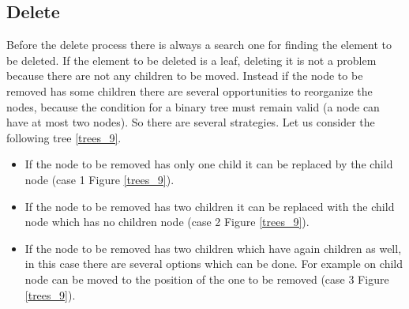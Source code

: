 \subsection{Delete}
Before the delete process there is always a search one for finding the element to be deleted. If the element to be deleted is a leaf, deleting it is not a problem because there are not any children to be moved. Instead if the node to be removed has some children there are several opportunities to reorganize the nodes, because the condition for a binary tree must remain valid (a node can have at most two nodes). So there are several strategies. Let us consider the following tree \ref{trees_9}. 
\begin{itemize}
\item If the node to be removed has only one child it can be replaced by the child node (case 1 Figure \ref{trees_9}).
\item If the node to be removed has two children it can be replaced with the child node which has no children node (case 2 Figure \ref{trees_9}).
\item If the node to be removed has two children which have again children as well, in this case there are several options which can be done. For example on child node can be moved to the position of the one to be removed (case 3 Figure \ref{trees_9}).
\end{itemize} 

